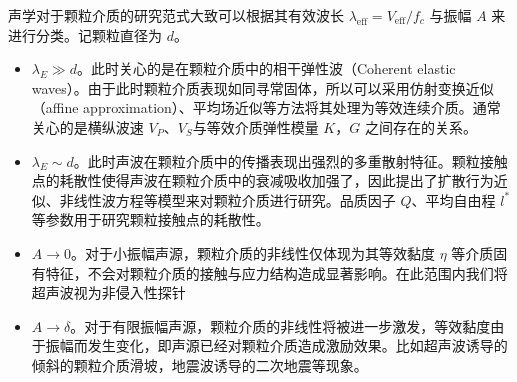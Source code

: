 声学对于颗粒介质的研究范式大致可以根据其有效波长 $\lambda_{\text{eff}} = V_{\text{eff}}/f_{c}$ 与振幅 $A$ 来进行分类。记颗粒直径为 $d$。

\begin{itemize}
  \item $\lambda_{E}\gg d$。此时关心的是在颗粒介质中的相干弹性波（Coherent elastic waves）。由于此时颗粒介质表现如同寻常固体，所以可以采用仿射变换近似（affine approximation）、平均场近似等方法将其处理为等效连续介质。通常关心的是横纵波速 $V_{P}$、$V_{S}$与等效介质弹性模量 $K$，$G$ 之间存在的关系。
  \item $\lambda_{E}\sim d$。此时声波在颗粒介质中的传播表现出强烈的多重散射特征。颗粒接触点的耗散性使得声波在颗粒介质中的衰减吸收加强了，因此提出了扩散行为近似\cite{PhysRevLett.93.154303}、非线性波方程\cite{Transitional,hamilton_nonlinear_1998}等模型来对颗粒介质进行研究。品质因子 $Q$、平均自由程 $l^{*}$ 等参数用于研究颗粒接触点的耗散性。
  \item $A\rightarrow 0$。对于小振幅声源，颗粒介质的非线性仅体现为其等效黏度 $\eta$ 等介质固有特征，不会对颗粒介质的接触与应力结构造成显著影响。在此范围内我们将超声波视为非侵入性探针
  \item $A\rightarrow \delta$。对于有限振幅声源，颗粒介质的非线性将被进一步激发，等效黏度由于振幅而发生变化，即声源已经对颗粒介质造成激励效果。比如超声波诱导的倾斜的颗粒介质滑坡\cite{PhysRevE.102.042901}，地震波诱导的二次地震\cite{johnson_nonlinear_2005}等现象。
\end{itemize}